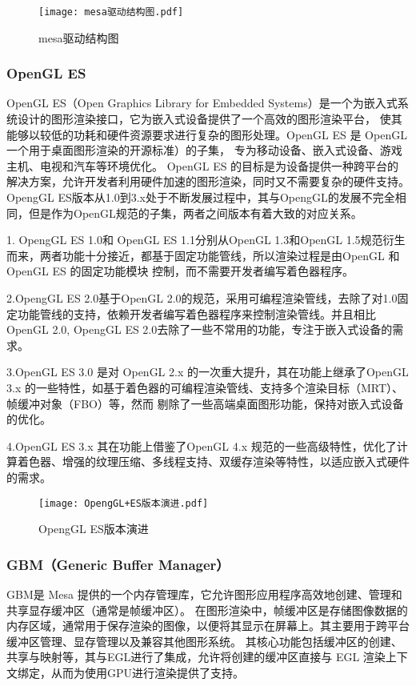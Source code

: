 \begin{figure}[h]
  \centering
  \texttt{[image: mesa驱动结构图.pdf]}
  \caption{mesa驱动结构图}\label{fig:mesa驱动结构图}
\end{figure}

\subsubsection{OpenGL ES}
OpenGL ES（Open Graphics Library for Embedded Systems）是一个为嵌入式系统设计的图形渲染接口，它为嵌入式设备提供了一个高效的图形渲染平台，
使其能够以较低的功耗和硬件资源要求进行复杂的图形处理。OpenGL ES 是 OpenGL\cite{2005Interpretive}一个用于桌面图形渲染的开源标准）的子集，
专为移动设备、嵌入式设备、游戏主机、电视和汽车等环境优化。
OpenGL ES 的目标是为设备提供一种跨平台的解决方案，允许开发者利用硬件加速的图形渲染，同时又不需要复杂的硬件支持。
OpengGL ES版本从1.0到3.x处于不断发展过程中，其与OpengGL的发展不完全相同，但是作为OpenGL规范的子集，两者之间版本有着大致的对应关系。

1. OpengGL ES 1.0和 OpenGL ES 1.1分别从OpenGL 1.3和OpenGL 1.5规范衍生而来，两者功能十分接近，都基于固定功能管线，所以渲染过程是由OpenGL 和 OpenGL ES 的固定功能模块
控制，而不需要开发者编写着色器程序。

2.OpengGL ES 2.0基于OpenGL 2.0的规范，采用可编程渲染管线，去除了对1.0固定功能管线的支持，依赖开发者编写着色器程序来控制渲染管线。并且相比OpenGL 2.0,
OpengGL ES 2.0去除了一些不常用的功能，专注于嵌入式设备的需求。

3.OpenGL ES 3.0 是对 OpenGL 2.x 的一次重大提升，其在功能上继承了OpenGL 3.x 的一些特性，如基于着色器的可编程渲染管线、支持多个渲染目标（MRT）、帧缓冲对象（FBO）等，然而
剔除了一些高端桌面图形功能，保持对嵌入式设备的优化。

4.OpenGL ES 3.x 其在功能上借鉴了OpenGL 4.x 规范的一些高级特性，优化了计算着色器、增强的纹理压缩、多线程支持、双缓存渲染等特性，以适应嵌入式硬件的需求。

\begin{figure}[h]
  \centering
  \texttt{[image: OpengGL+ES版本演进.pdf]}
  \caption{OpengGL ES版本演进}\label{fig:OpengGL ES版本演进}
\end{figure}

\subsubsection{GBM（Generic Buffer Manager）}
GBM是 Mesa 提供的一个内存管理库，它允许图形应用程序高效地创建、管理和共享显存缓冲区（通常是帧缓冲区）。
在图形渲染中，帧缓冲区是存储图像数据的内存区域，通常用于保存渲染的图像，以便将其显示在屏幕上。其主要用于跨平台缓冲区管理、显存管理以及兼容其他图形系统。
其核心功能包括缓冲区的创建、共享与映射等，其与EGL进行了集成，允许将创建的缓冲区直接与 EGL 渲染上下文绑定，从而为使用GPU进行渲染提供了支持。

